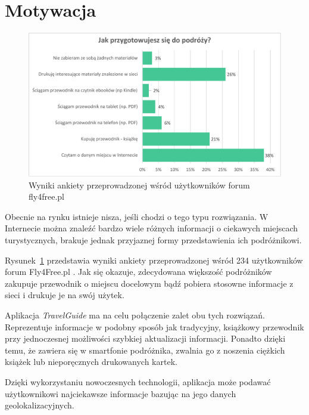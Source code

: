 \documentclass{book}
\newcommand{\appName}{\emph{TravelGuide} }
\begin{document}
		\section{Motywacja}
	
		\begin{figure}		
			\centering
			\includegraphics[width=1.0\textwidth]{images/fly4freeAnkieta.pdf}
			\caption{Wyniki ankiety przeprowadzonej wśród użytkowników forum fly4free.pl}
			\label{fig:fly4freeAnkieta}
		\end{figure}
	
		Obecnie na rynku istnieje nisza, jeśli chodzi o tego typu rozwiązania. W Internecie można znaleźć bardzo wiele różnych informacji o ciekawych miejscach turystycznych, brakuje jednak przyjaznej formy przedstawienia ich podróżnikowi. 
		
		Rysunek~\ref{fig:fly4freeAnkieta} przedstawia wyniki ankiety przeprowadzonej wśród 234 użytkowników forum Fly4Free.pl \cite{id:fly4free}. Jak się okazuje, zdecydowana większość podróżników zakupuje przewodnik o miejscu docelowym bądź pobiera stosowne informacje z sieci i drukuje je na swój użytek.
		
		Aplikacja \appName ma na celu połączenie zalet obu tych rozwiązań. Reprezentuje informacje w podobny sposób jak tradycyjny, książkowy przewodnik przy jednoczesnej możliwości szybkiej aktualizacji informacji. Ponadto dzięki temu, że zawiera się w smartfonie podróżnika, zwalnia go z noszenia ciężkich książek lub nieporęcznych drukowanych kartek. 
			
		Dzięki wykorzystaniu nowoczesnych technologii, aplikacja może podawać użytkownikowi najciekawsze informacje bazując na jego danych geolokalizacyjnych. 
	
\end{document}
